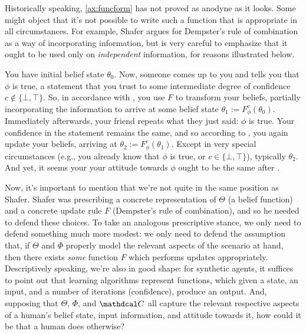 \documentclass{article}
\def\confdom{\mathdcal C}
\begin{document}

Historically speaking, \cref{ax:funcform} has not proved as anodyne as it looks. 
Some might object that it's not possible to write such a function that is appropriate in all circumstances.
For example, Shafer argues for Dempster's rule of combination as a way of incorporating information, but is very careful to emphasize that it ought to be used only on \emph{independent} information, for reasons illustrated below. 



\begin{example}\label{ex:dupl}
    You have initial belief state $\theta_0$.
    Now, someone comes up to you and tells you that $\phi$ is true, a statement
        that you trust to some intermediate degree of confidence $c \notin\{ \bot, \top\}$. 
    So, in accordance with , you use $F$ to transform your beliefs, partially incorporating the information to arrive at some belief state $\theta_1 := F^c_\phi(\theta_0)$.
    Immediately afterwards, your friend repeats what they just said: $\phi$ is true. 
    Your confidence in the statement remains the same, and so according to 
    , you again update your beliefs, arriving at $\theta_2 := F^c_\phi(\theta_1)$. 
    Except in very special circumstances (e.g., you already know that $\phi$ is true, or $c \in \{\bot,\top\}$), typically $\theta_2$. 
    And yet, it seems your your attitude towards $\phi$ ought to be the same after .
\end{example}


Now, it's important to mention that we're not quite in the same position as Shafer.
Shafer was prescribing a concrete representation of $\Theta$ (a belief function) and a concrete update rule $F$ (Dempster's rule of combination), and so he needed to defend these choices. 
To take an analogous prescriptive stance, we only need to defend something much more modest: we only need to defend the assumption that, if $\Theta$ and $\Phi$ properly model the relevant aspects of the scenario at hand, then there exists \emph{some} function $F$ which performs updates appropriately. 
Descriptively speaking, we're also in good shape: for synthetic agents, it suffices to point out that learning algorithms represent functions, which given a state, an input, and a number of iterations (confidence), produce an output. 
And, supposing that $\Theta$, $\Phi$, and $\confdom$ all capture the relevant respective aspects of a human's belief state, input information, and attitude towards it, how could it be that a human does otherwise?
\end{document}
